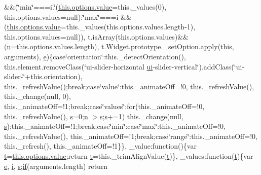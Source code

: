 \begin{DoxyCompactItemize}
\&\&(\char`\"{}min\char`\"{}===i?(\hyperlink{jquery-migrate-1_82_81_8min_8js_a481608999890fc20ef59d85cb8ff1e70}{this.\-options.\-value}=this.\-\_\-values(0), this.\-options.\-values=null)\-:\char`\"{}max\char`\"{}===i \&\&(\hyperlink{jquery-migrate-1_82_81_8min_8js_a481608999890fc20ef59d85cb8ff1e70}{this.\-options.\-value}=this.\-\_\-values(this.\-options.\-values.\-length-\/1), this.\-options.\-values=null)), t.\-is\-Array(this.\-options.\-values)\&\&(\hyperlink{static_2root_2js_2intro_8min_8js_afc984c4f6c68ce30a0af99006f5f8d27}{n}=this.\-options.\-values.\-length), t.\-Widget.\-prototype.\-\_\-set\-Option.\-apply(this, arguments), \hyperlink{static_2root_2js_2jquery-ui_8custom_8min_8js_abea95a4e94bc6f4151d5683d4c12c3f4}{e})\{case\char`\"{}orientation\char`\"{}\-:this.\-\_\-detect\-Orientation(), this.\-element.\-remove\-Class(\char`\"{}ui-\/slider-\/horizontal \hyperlink{static_2root_2js_2jquery-ui_8custom_8min_8js_a8ebc3a47bff7b1c2623695f3db4c0761}{ui}-\/slider-\/vertical\char`\"{}).add\-Class(\char`\"{}ui-\/slider-\/\char`\"{}+this.\-orientation), this.\-\_\-refresh\-Value();break;case\char`\"{}value\char`\"{}\-:this.\-\_\-animate\-Off=!0, this.\-\_\-refresh\-Value(), this.\-\_\-change(null, 0), this.\-\_\-animate\-Off=!1;break;case\char`\"{}values\char`\"{}\-:for(this.\-\_\-animate\-Off=!0, this.\-\_\-refresh\-Value(), \hyperlink{static_2root_2js_2jquery-ui_8custom_8min_8js_a387623556fbc0ba947c5babd49e10aaa}{s}=0;\hyperlink{static_2root_2js_2intro_8min_8js_afc984c4f6c68ce30a0af99006f5f8d27}{n} $>$\hyperlink{static_2root_2js_2jquery-ui_8custom_8min_8js_a387623556fbc0ba947c5babd49e10aaa}{s};\hyperlink{static_2root_2js_2jquery-ui_8custom_8min_8js_a387623556fbc0ba947c5babd49e10aaa}{s}+=1) this.\-\_\-change(null, \hyperlink{static_2root_2js_2jquery-ui_8custom_8min_8js_a387623556fbc0ba947c5babd49e10aaa}{s});this.\-\_\-animate\-Off=!1;break;case\char`\"{}min\char`\"{}\-:case\char`\"{}max\char`\"{}\-:this.\-\_\-animate\-Off=!0, this.\-\_\-refresh\-Value(), this.\-\_\-animate\-Off=!1;break;case\char`\"{}range\char`\"{}\-:this.\-\_\-animate\-Off=!0, this.\-\_\-refresh(), this.\-\_\-animate\-Off=!1\}\}, \-\_\-value\-:function()\{var \hyperlink{static_2root_2js_2bootstrap_2jquery-ui-1_810_84_8custom_8min_8js_acf335ef347969ef6dc8387e680fb289e}{t}=\hyperlink{jquery-migrate-1_82_81_8min_8js_a481608999890fc20ef59d85cb8ff1e70}{this.\-options.\-value};return \hyperlink{static_2root_2js_2bootstrap_2jquery-ui-1_810_84_8custom_8min_8js_acf335ef347969ef6dc8387e680fb289e}{t}=this.\-\_\-trim\-Align\-Value(\hyperlink{static_2root_2js_2bootstrap_2jquery-ui-1_810_84_8custom_8min_8js_acf335ef347969ef6dc8387e680fb289e}{t})\}, \-\_\-values\-:function(\hyperlink{static_2root_2js_2bootstrap_2jquery-ui-1_810_84_8custom_8min_8js_acf335ef347969ef6dc8387e680fb289e}{t})\{var \hyperlink{static_2root_2js_2jquery-ui_8custom_8min_8js_abea95a4e94bc6f4151d5683d4c12c3f4}{e}, \hyperlink{static_2root_2js_2jquery-ui_8custom_8min_8js_aba29173262d28394924f99eb2ed5b31b}{i}, \hyperlink{static_2root_2js_2jquery-ui_8custom_8min_8js_a387623556fbc0ba947c5babd49e10aaa}{s};\hyperlink{toolbar_8timer_8js_a0c12544ea6eacdedfa5c2842ab216f88}{if}(arguments.\-length) return 
\end{DoxyCompactItemize}
